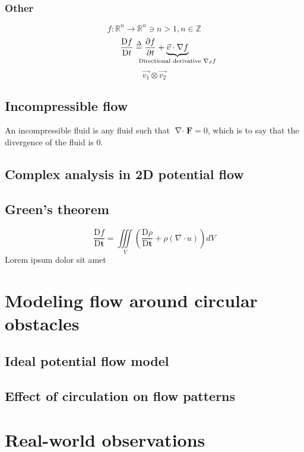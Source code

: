\documentclass[a4paper,12pt]{article}
\newcommand{\fatf}{\mathbf{F}}         		%
\newcommand{\partialder}[2]{\frac{\partial #1}{\partial #2}}        %
\newcommand{\materialder}[2]{\frac{\mathrm{D} #1}{\mathrm{D} #2}}   %
\DeclareMathOperator{\divergence}{\nabla\cdot}
\newcommand{\definedas}{\stackrel{\Delta}{=}}     			%
\begin{document}
\subsubsection*{Other}
$$f:\mathbb{R}^n\rightarrow\mathbb{R}^n\ni n>1,n\in\mathbb{Z}$$
\begin{equation}
	\materialder{f}{t}\definedas\partialder{f}{t}+\underbrace{\vec{v}\cdot\nabla f}_{\hidewidth\text{Directional derivative }\nabla_{\vec{v}}f\hidewidth}
\end{equation}
$$\vec{v_1}\otimes\vec{v_2}$$

\subsection{Incompressible flow}
An incompressible fluid is any fluid such that $\divergence\fatf=0$, which is to say that the divergence of the fluid is 0.

\subsection{Complex analysis in 2D potential flow}

\subsection*{Green's theorem}\label{sec:greenstheorem}
\begin{equation} %
	\materialder{f}{\mathbf{t}}=\iiint\limits_{V}(\materialder{\rho}{\mathbf{t}}+\rho(\nabla\cdot u))dV
\end{equation}
Lorem ipsum dolor sit amet \cite{peyret2012computational}

\section{Modeling flow around circular obstacles}
\subsection{Ideal potential flow model}
\subsection{Effect of circulation on flow patterns}
\section{Real-world observations}
\end{document}
